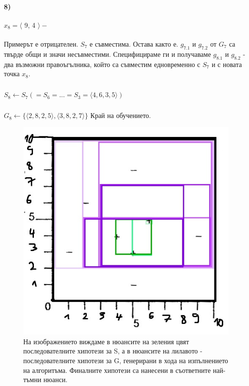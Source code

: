 \documentclass[12pt]{article}
\begin{document}
	\paragraph{8)} $x_{8} = \langle $ 9, 4 $\rangle  -$
	\paragraph{}
	Примерът е отрицателен. $S_{7}$ е съвместима. Остава както е. $g_{7.1}$ и $g_{7.2}$ от $G_{7}$ са твърде общи и значи несъвместими. Специфицираме ги и получаваме $g_{8.1}$ и $g_{8.2}$ - два възможни правоъгълника, който са съвместим едновременно с $S_{7}$ и с новата точка $x_{8}$.
	\subparagraph{}
	$S_{8} \leftarrow S_{7} (= S_{6} = ... = S_{3} = \langle 4, 6, 3, 5 \rangle)$
	\subparagraph{}
	$G_{8} \leftarrow \{ \langle 2, 8, 2, 5 \rangle,\langle 3, 8, 2, 7 \rangle \}$
	\newline\newline
	Край на обучението.
	\newpage
	
	\begin{figure}[H]
		\centering
		\includegraphics[width=150mm]{Untitled.jpg} 
		\caption{На изображението виждаме в нюансите на зеления цвят последователните хипотези за S, а в нюансите на лилавото - последователните хипотези за G, генерирани в хода на изпълнението на алгоритъма. Финалните хипотези са нанесени в съответните най-тъмни нюанси.}
	\end{figure}
	
\end{document}
